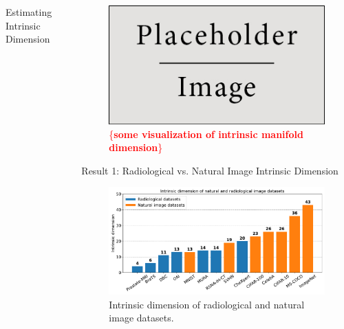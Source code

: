 \documentclass[final,hyperref={pdfpagelabels=false}]{beamer}
\newcommand{\todo}[1]{\textcolor{red}{\{\textbf{#1}\}}}
\begin{document}
\begin{frame}[t]
\begin{columns}[t]
\begin{column}{.3\textwidth}
\begin{block}{Estimating Intrinsic Dimension}
\end{block}


\end{column} %

\begin{column}{.03\textwidth}\end{column} %
 
\begin{column}{.3\textwidth} %

\begin{figure}
    \includegraphics[width=0.95\linewidth]{placeholder.jpg}
     \caption{\todo{some visualization of intrinsic manifold dimension}}
\end{figure}

\begin{block}{Result 1: Radiological vs. Natural Image Intrinsic Dimension}
\begin{figure}
    \includegraphics[width=0.95\linewidth]{frompaper/ID.pdf}
     \caption{Intrinsic dimension of \textcolor{paperblue}{radiological} and \textcolor{paperorange}{natural} \cite{pope2021intrinsic} image datasets.}
\end{figure}


\end{block}
\end{column}
\end{columns}
\end{frame}
\end{document}
